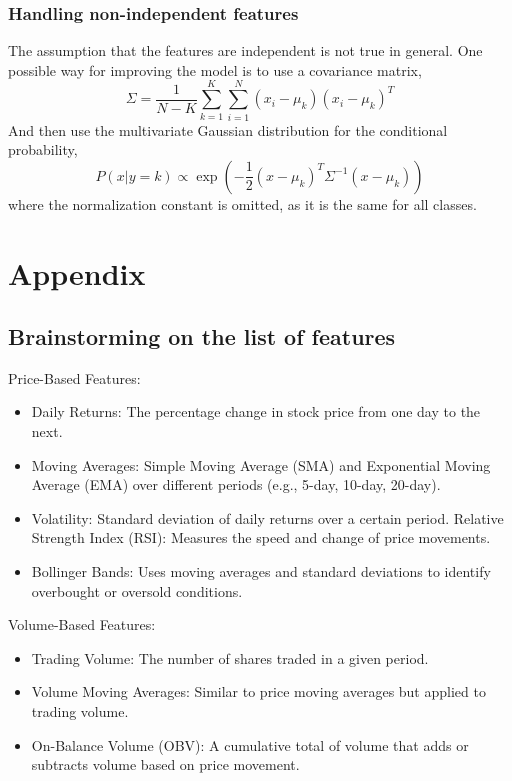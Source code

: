 \documentclass{article}
\begin{document}
\subsubsection*{Handling non-independent features}
The assumption that the features are independent is not true in general.
One possible way for improving the model is to use a covariance matrix,
\[{\Sigma} = \frac{1}{{N - K}}\sum\limits_{k = 1}^K {\sum\limits_{i = 1}^N {\left( {{x_i} - {\mu _k}} \right){{\left( {{x_i} - {\mu _k}} \right)}^T}} } \]
And then use the multivariate Gaussian distribution for the conditional probability,
\[P\left( {x|y = k} \right) \propto \exp \left( { - \frac{1}{2}{{\left( {x - {\mu _k}} \right)}^T}{\Sigma ^{ - 1}}\left( {x - {\mu _k}} \right)} \right)\]
where the normalization constant is omitted, as it is the same for all classes.



\section{Appendix}
\subsection{Brainstorming on the list of features}
\small

Price-Based Features:

\begin{itemize}
    \item Daily Returns: The percentage change in stock price from one day to the next.
    \item Moving Averages: Simple Moving Average (SMA) and Exponential Moving Average (EMA) over different periods (e.g., 5-day, 10-day, 20-day).
    \item Volatility: Standard deviation of daily returns over a certain period. Relative Strength Index (RSI): Measures the speed and change of price movements.
    \item Bollinger Bands: Uses moving averages and standard deviations to identify overbought or oversold conditions.
\end{itemize}

Volume-Based Features:

\begin{itemize}
    \item Trading Volume: The number of shares traded in a given period.
    \item Volume Moving Averages: Similar to price moving averages but applied to trading volume.
    \item On-Balance Volume (OBV): A cumulative total of volume that adds or subtracts volume based on price movement.
\end{itemize}
\end{document}
